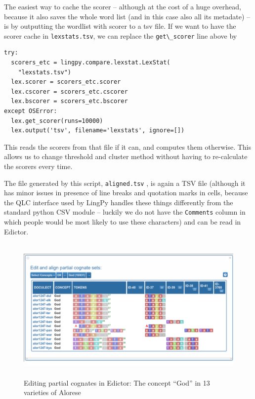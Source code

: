 \documentclass[
  english,
  a4paper,
  oneside,tablecaptionabove
]{scrbook}
\newcommand{\passthrough}[1]{#1}
\begin{document}
The easiest way to cache the scorer -- although at the cost of a huge
overhead, because it also saves the whole word list (and in this case
also all its metadate) -- is by outputting the wordlist with scorer to a
tsv file. If we want to have the scorer cache in
\passthrough{\lstinline!lexstats.tsv!}, we can replace the
\passthrough{\lstinline!get\_scorer!} line above by

\begin{lstlisting}
try:
  scorers_etc = lingpy.compare.lexstat.LexStat(
    "lexstats.tsv")
  lex.scorer = scorers_etc.scorer
  lex.cscorer = scorers_etc.cscorer
  lex.bscorer = scorers_etc.bscorer
except OSError:
  lex.get_scorer(runs=10000)
  lex.output('tsv', filename='lexstats', ignore=[])
\end{lstlisting}

This reads the scorers from that file if it can, and computes them
otherwise. This allows us to change threshold and cluster method without
having to re-calculate the scorers every time.

The file generated by this script, \passthrough{\lstinline!aligned.tsv!}
, is again a TSV file (although it has minor issues in presence of line
breaks and quotation marks in cells, because the QLC interface used by
LingPy handles these things differently from the standard python CSV
module -- luckily we do not have the \passthrough{\lstinline!Comments!}
column in which people would be most likely to use these characters) and
can be read in Edictor.

\begin{figure}
\centering
\includegraphics[width=5.20833in,height=2.78125in]{images/__calc.hypotheses.org_files_2018_10_PartialCognatesGod-500x267.png}
\caption{Editing partial cognates in Edictor: The concept \enquote{God}
in 13 varieties of Alorese}
\end{figure}
\end{document}
